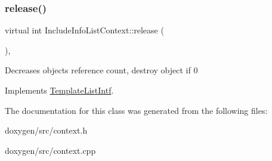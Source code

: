 \mbox{\label{class_include_info_list_context_a8791d673ef9ceb58785f1bf729d53ed1}} 
\subsubsection{\texorpdfstring{release()}{release()}}
{\footnotesize\ttfamily virtual int Include\+Info\+List\+Context\+::release (\begin{DoxyParamCaption}{ }\end{DoxyParamCaption})\hspace{0.3cm}{\ttfamily [inline]}, {\ttfamily [virtual]}}

Decreases object\textquotesingle{}s reference count, destroy object if 0 

Implements \mbox{\hyperlink{class_template_list_intf_a0c53169c740c09dac47efc62bbe39674}{Template\+List\+Intf}}.



The documentation for this class was generated from the following files\+:\begin{DoxyCompactItemize}
\item 
doxygen/src/context.\+h\item 
doxygen/src/context.\+cpp\end{DoxyCompactItemize}

